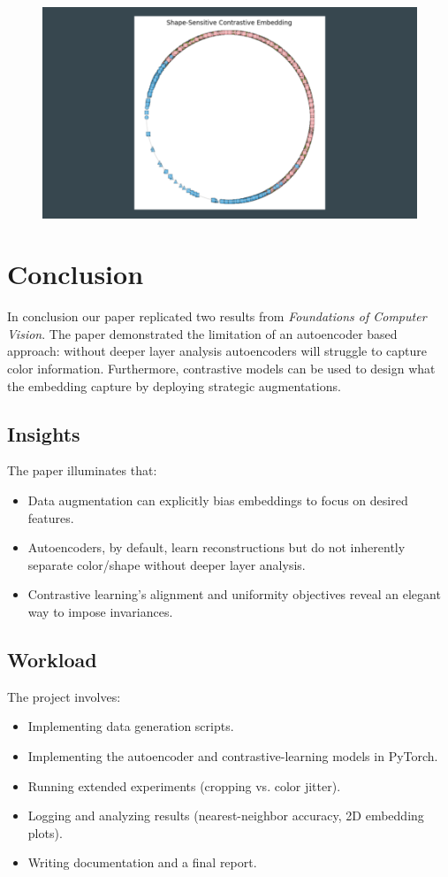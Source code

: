 \documentclass{article}
\begin{document}
\begin{figure}[h]
    \centering
    \includegraphics[scale=0.25]{contrastive_shape_sensitive}
    \caption{}
    \label{fig:contrastive_shape_sensitive1}
\end{figure}
\section{Conclusion}
In conclusion our paper replicated two results from \textit{Foundations of Computer Vision}. 
The paper demonstrated the limitation of an autoencoder based approach:
without deeper layer analysis autoencoders will struggle to capture color information.
Furthermore, contrastive models can be used to design what the embedding capture by deploying strategic augmentations.
\subsection{Insights}
The paper illuminates that:
\begin{itemize}
    \item Data augmentation can explicitly bias embeddings to focus on desired features.
    \item Autoencoders, by default, learn reconstructions but do not inherently separate color/shape without deeper layer analysis.
    \item Contrastive learning’s alignment and uniformity objectives reveal an elegant way to impose invariances. 
\end{itemize}
\subsection{Workload}
The project involves:
\begin{itemize}
    \item Implementing data generation scripts.
    \item Implementing the autoencoder and contrastive-learning models in PyTorch.
    \item Running extended experiments (cropping vs. color jitter).
    \item Logging and analyzing results (nearest-neighbor accuracy, 2D embedding plots).
    \item Writing documentation and a final report. 
\end{itemize}
\end{document}
